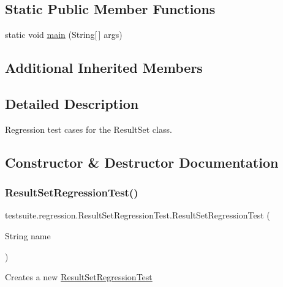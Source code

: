 \subsection*{Static Public Member Functions}
\begin{DoxyCompactItemize}
\item 
static void \mbox{\hyperlink{classtestsuite_1_1regression_1_1_result_set_regression_test_a3ccb44f60c1c13e2fc475a453f25866f}{main}} (String\mbox{[}$\,$\mbox{]} args)
\end{DoxyCompactItemize}
\subsection*{Additional Inherited Members}


\subsection{Detailed Description}
Regression test cases for the Result\+Set class. 

\subsection{Constructor \& Destructor Documentation}
\mbox{\label{classtestsuite_1_1regression_1_1_result_set_regression_test_a5ca33c73ced6b3a694b444d75b08413b}} 
\subsubsection{\texorpdfstring{Result\+Set\+Regression\+Test()}{ResultSetRegressionTest()}}
{\footnotesize\ttfamily testsuite.\+regression.\+Result\+Set\+Regression\+Test.\+Result\+Set\+Regression\+Test (\begin{DoxyParamCaption}\item[{String}]{name }\end{DoxyParamCaption})}

Creates a new \mbox{\hyperlink{classtestsuite_1_1regression_1_1_result_set_regression_test}{Result\+Set\+Regression\+Test}}


